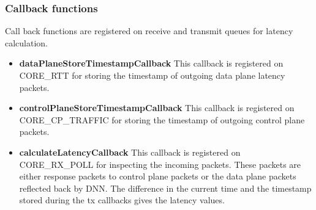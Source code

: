 \subsubsection{Callback functions}
Call back functions are registered on receive and transmit queues for latency calculation.
\begin{itemize}
	\item \textbf{dataPlaneStoreTimestampCallback}
	      This callback is registered on CORE\_RTT for storing the timestamp of outgoing  data plane latency packets.
	\item \textbf{controlPlaneStoreTimestampCallback} This callback is registered on CORE\_CP\_TRAFFIC for storing the timestamp of outgoing control plane packets.
	\item \textbf{calculateLatencyCallback} This callback is registered on CORE\_RX\_POLL for inspecting the incoming packets.
	      These packets are either response packets to control plane packets or the data plane packets reflected back by DNN. The difference in the current time and the timestamp stored during the tx callbacks gives the latency values.
\end{itemize}
%
